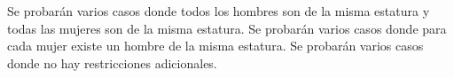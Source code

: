 \documentclass{oci}
\begin{document}
\begin{scoreDescription}
   Se probarán varios casos donde todos los hombres son de la misma estatura y todas las mujeres son de la misma estatura.
   Se probarán varios casos donde para cada mujer existe un hombre de la misma estatura.
   Se probarán varios casos donde no hay restricciones adicionales.
\end{scoreDescription}

\begin{sampleDescription}
\end{sampleDescription}
\end{document}
